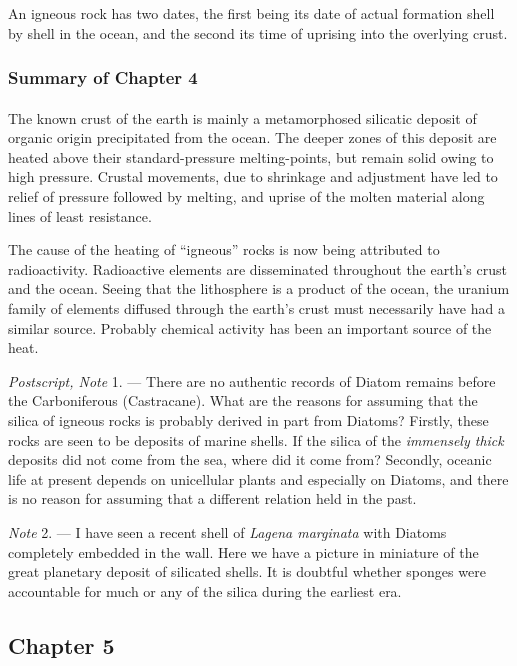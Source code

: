 \documentclass[a4paper, 12pt, oneside]{article}
\begin{document}
An igneous rock has two dates, the first being its date of actual formation shell by shell in the ocean, and the second its time of uprising into the overlying crust.

\subsubsection{Summary of Chapter 4} 
\paragraph{}
The known crust of the earth is mainly a metamorphosed silicatic deposit of organic origin precipitated from the ocean. The deeper zones of this deposit are heated above their standard-pressure melting-points, but remain solid owing to high pressure. Crustal movements, due to shrinkage and adjustment have led to relief of pressure followed by melting, and uprise of the molten material along lines of least resistance.

The cause of the heating of ``igneous'' rocks is now being attributed to radioactivity. Radioactive elements are disseminated throughout the earth's crust and the ocean. Seeing that the lithosphere is a product of the ocean, the uranium family of elements diffused through the earth's crust must necessarily have had a similar source. Probably chemical activity has been an important source of the heat.

\emph{Postscript, Note} 1. --- There are no authentic records of Diatom remains before the Carboniferous (Castracane). What are the reasons for assuming that the silica of igneous rocks is probably derived in part from Diatoms? Firstly, these rocks are seen to be deposits of marine shells. If the silica of the \emph{immensely thick} deposits did not come from the sea, where did it come from? Secondly, oceanic life at present depends on unicellular plants and especially on Diatoms, and there is no reason for assuming that a different relation held in the past.

\emph{Note} 2. --- I have seen a recent shell of \emph{Lagena marginata} with Diatoms completely embedded in the wall. Here we have a picture in miniature of the great planetary deposit of silicated shells. It is doubtful whether sponges were accountable for much or any of the silica during the earliest era.
\clearpage
\subsection{Chapter 5}
\end{document}
